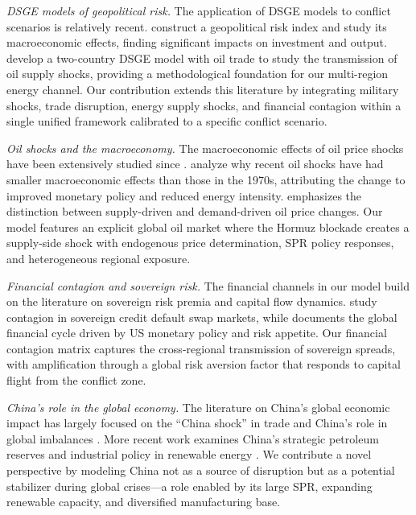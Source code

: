 \documentclass[12pt,a4paper]{article}
\begin{document}
\textit{DSGE models of geopolitical risk.} The application of DSGE models to conflict scenarios is relatively recent. \citet{caldara2022measuring} construct a geopolitical risk index and study its macroeconomic effects, finding significant impacts on investment and output. \citet{bodenstein2011oil} develop a two-country DSGE model with oil trade to study the transmission of oil supply shocks, providing a methodological foundation for our multi-region energy channel. Our contribution extends this literature by integrating military shocks, trade disruption, energy supply shocks, and financial contagion within a single unified framework calibrated to a specific conflict scenario.

\textit{Oil shocks and the macroeconomy.} The macroeconomic effects of oil price shocks have been extensively studied since \citet{hamilton1983oil}. \citet{blanchard2007macroeconomic} analyze why recent oil shocks have had smaller macroeconomic effects than those in the 1970s, attributing the change to improved monetary policy and reduced energy intensity. \citet{kilian2009not} emphasizes the distinction between supply-driven and demand-driven oil price changes. Our model features an explicit global oil market where the Hormuz blockade creates a supply-side shock with endogenous price determination, SPR policy responses, and heterogeneous regional exposure.

\textit{Financial contagion and sovereign risk.} The financial channels in our model build on the literature on sovereign risk premia and capital flow dynamics. \citet{longstaff2011financial} study contagion in sovereign credit default swap markets, while \citet{rey2015dilemma} documents the global financial cycle driven by US monetary policy and risk appetite. Our financial contagion matrix captures the cross-regional transmission of sovereign spreads, with amplification through a global risk aversion factor that responds to capital flight from the conflict zone.

\textit{China's role in the global economy.} The literature on China's global economic impact has largely focused on the ``China shock'' in trade \citep{autor2013china} and China's role in global imbalances \citep{bernanke2005global}. More recent work examines China's strategic petroleum reserves \citep{zhang2020china} and industrial policy in renewable energy \citep{helveston2019china}. We contribute a novel perspective by modeling China not as a source of disruption but as a potential stabilizer during global crises---a role enabled by its large SPR, expanding renewable capacity, and diversified manufacturing base.
\end{document}
